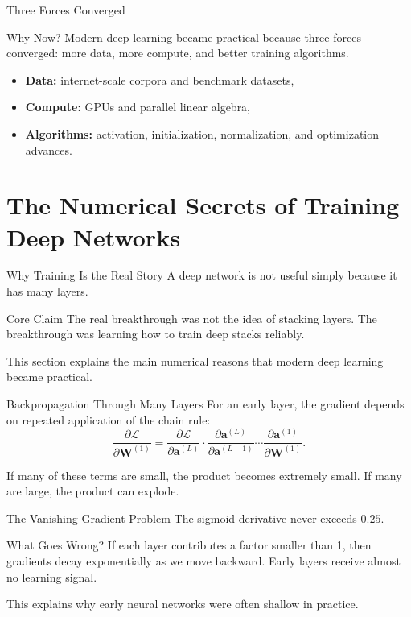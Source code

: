 \documentclass[12pt]{beamer}
\begin{document}
\begin{frame}{Three Forces Converged}
  \begin{conceptbox}{Why Now?}
    Modern deep learning became practical because three forces converged: more data, more compute, and better training algorithms.
  \end{conceptbox}

  \begin{itemize}
    \item \textbf{Data:} internet-scale corpora and benchmark datasets,
    \item \textbf{Compute:} GPUs and parallel linear algebra,
    \item \textbf{Algorithms:} activation, initialization, normalization, and optimization advances.
  \end{itemize}
\end{frame}

\section{The Numerical Secrets of Training Deep Networks}

\begin{frame}{Why Training Is the Real Story}
  A deep network is not useful simply because it has many layers.

  \begin{conceptbox}{Core Claim}
    The real breakthrough was not the idea of stacking layers. The breakthrough was learning how to train deep stacks reliably.
  \end{conceptbox}

  This section explains the main numerical reasons that modern deep learning became practical.
\end{frame}

\begin{frame}{Backpropagation Through Many Layers}
  For an early layer, the gradient depends on repeated application of the chain rule:
  \[
    \frac{\partial \mathcal{L}}{\partial \mathbf{W}^{(1)}}
    =
    \frac{\partial \mathcal{L}}{\partial \mathbf{a}^{(L)}}
    \cdot
    \frac{\partial \mathbf{a}^{(L)}}{\partial \mathbf{a}^{(L-1)}}
    \cdots
    \frac{\partial \mathbf{a}^{(1)}}{\partial \mathbf{W}^{(1)}}.
  \]

  If many of these terms are small, the product becomes extremely small. If many are large, the product can explode.
\end{frame}

\begin{frame}{The Vanishing Gradient Problem}
  The sigmoid derivative never exceeds $0.25$.

  \begin{warningbox}{What Goes Wrong?}
    If each layer contributes a factor smaller than 1, then gradients decay exponentially as we move backward. Early layers receive almost no learning signal.
  \end{warningbox}

  This explains why early neural networks were often shallow in practice.
\end{frame}
\end{document}
